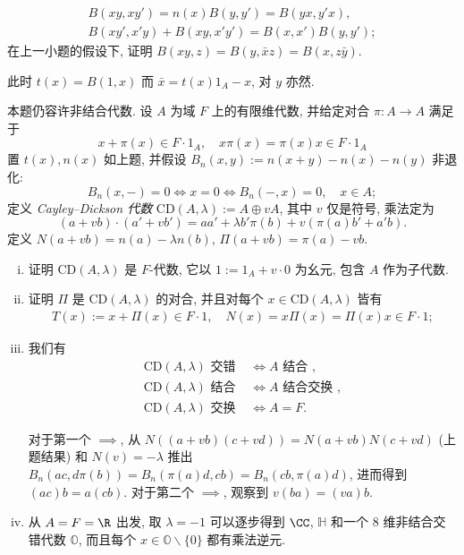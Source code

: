\begin{Exercises}
\begin{enumerate}[(i)]
				\begin{align*}
					B(xy,xy') = n(x)B(y,y') = B(yx,y'x), \\
					B(xy', x'y) + B(xy, x'y') = B(x,x')B(y,y');
				\end{align*}
				在上一小题的假设下, 证明 $B(xy,z) = B(y,\bar{x}z) = B(x, z\bar{y})$. \begin{hint} 此时 $t(x) = B(1,x)$ 而 $\bar{x} = t(x) 1_A - x$, 对 $y$ 亦然.\end{hint}
		\end{enumerate}
	\item 本题仍容许非结合代数. 设 $A$ 为域 $F$ 上的有限维代数, 并给定对合 $\pi: A \to A$ 满足于
		\[ x + \pi(x) \in F \cdot 1_A, \quad x\pi(x) = \pi(x) x \in F \cdot 1_A \]
		置 $t(x), n(x)$ 如上题, 并假设 $B_n(x,y) := n(x+y) - n(x) - n(y)$ 非退化:
		\[ B_n(x,-) = 0 \iff x = 0 \iff B_n(-,x)=0, \quad x \in A; \]
		定义 \emph{Cayley--Dickson 代数} $\text{CD}(A, \lambda) := A \oplus vA$, 其中 $v$ 仅是符号, 乘法定为
		\[ (a + vb) \cdot (a' + vb') = aa' + \lambda b' \pi(b) + v \left( \pi(a)b' + a'b \right). \]
		定义 $N(a+vb) = n(a) - \lambda n(b)$, $\Pi(a+vb) = \pi(a) - vb$.
		\begin{enumerate}[(i)]
			\item 证明 $\text{CD}(A, \lambda)$ 是 $F$-代数, 它以 $1 := 1_A + v \cdot 0$ 为幺元, 包含 $A$ 作为子代数.
			\item 证明 $\Pi$ 是 $\text{CD}(A, \lambda)$ 的对合, 并且对每个 $x \in \text{CD}(A, \lambda)$ 皆有
				\begin{gather*}
					T(x) := x + \Pi(x) \in F \cdot 1, \quad N(x) = x\Pi(x) = \Pi(x) x \in F \cdot 1;
				\end{gather*}
			\item 我们有
				\begin{align*}
					\text{CD}(A, \lambda) \text{ 交错} & \iff A \text { 结合 }, \\
					\text{CD}(A, \lambda) \text{ 结合 } & \iff A \text { 结合交换 }, \\
					\text{CD}(A, \lambda) \text{ 交换 } & \iff A=F.
				\end{align*}
				\begin{hint} 对于第一个 $\implies$, 从 $N((a+vb)(c+vd)) = N(a+vb)N(c+vd)$ (上题结果) 和 $N(v)=-\lambda$ 推出 $B_n(ac, d\pi(b)) = B_n(\pi(a)d, cb) = B_n(cb, \pi(a)d)$, 进而得到 $(ac)b = a(cb)$. 对于第二个 $\implies$, 观察到 $v(ba) = (va)b$. \end{hint}
			\item 从 $A=F=\R$ 出发, 取 $\lambda=-1$ 可以逐步得到 $\CC$, $\mathbb{H}$ 和一个 $8$ 维非结合交错代数 $\mathbb{O}$, 而且每个 $x \in \mathbb{O} \smallsetminus \{0\}$ 都有乘法逆元.

\end{enumerate}
\end{Exercises}
